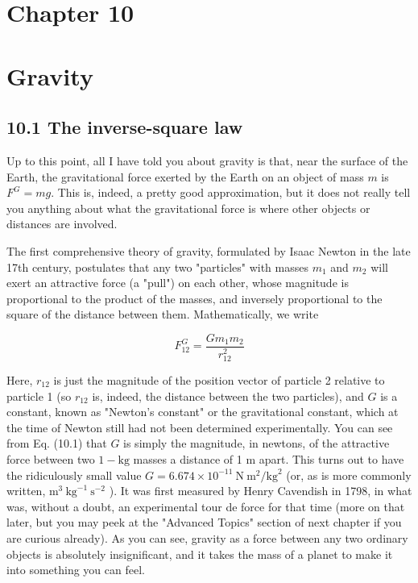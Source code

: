 \documentclass[10pt]{article}
\begin{document}
\section*{Chapter 10}
\section*{Gravity}
\subsection*{10.1 The inverse-square law}
Up to this point, all I have told you about gravity is that, near the surface of the Earth, the gravitational force exerted by the Earth on an object of mass $m$ is $F^{G}=m g$. This is, indeed, a pretty good approximation, but it does not really tell you anything about what the gravitational force is where other objects or distances are involved.

The first comprehensive theory of gravity, formulated by Isaac Newton in the late 17th century, postulates that any two "particles" with masses $m_{1}$ and $m_{2}$ will exert an attractive force (a "pull") on each other, whose magnitude is proportional to the product of the masses, and inversely proportional to the square of the distance between them. Mathematically, we write


\begin{equation*}
F_{12}^{G}=\frac{G m_{1} m_{2}}{r_{12}^{2}} \tag{10.1}
\end{equation*}


Here, $r_{12}$ is just the magnitude of the position vector of particle 2 relative to particle 1 (so $r_{12}$ is, indeed, the distance between the two particles), and $G$ is a constant, known as "Newton's constant" or the gravitational constant, which at the time of Newton still had not been determined experimentally. You can see from Eq. (10.1) that $G$ is simply the magnitude, in newtons, of the attractive force between two $1-\mathrm{kg}$ masses a distance of 1 m apart. This turns out to have the ridiculously small value $G=6.674 \times 10^{-11} \mathrm{~N} \mathrm{~m}^{2} / \mathrm{kg}^{2}$ (or, as is more commonly written, $\mathrm{m}^{3} \mathrm{~kg}^{-1} \mathrm{~s}^{-2}$ ). It was first measured by Henry Cavendish in 1798, in what was, without a doubt, an experimental tour de force for that time (more on that later, but you may peek at the "Advanced Topics" section of next chapter if you are curious already). As you can see, gravity as a force between any two ordinary objects is absolutely insignificant, and it takes the mass of a planet to make it into something you can feel.
\end{document}

